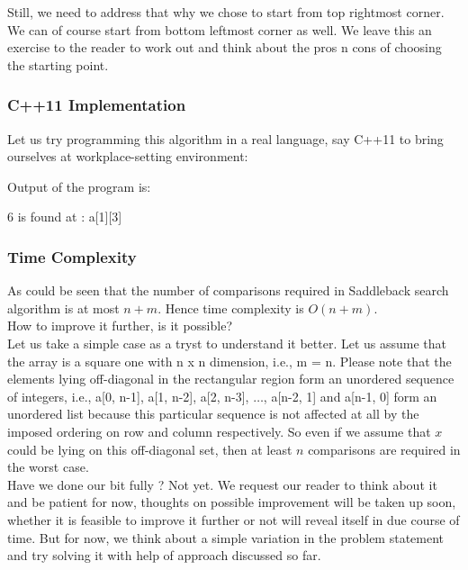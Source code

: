 Still, we need to address that why we chose to start from top rightmost corner. We can of course start from bottom leftmost corner as well. We leave this an exercise to the reader to work out and think about the pros n cons of choosing the starting point.

\subsubsection{C++11 Implementation}

Let us try programming this algorithm in a real language, say C++11 to bring ourselves at workplace-setting environment:




Output of the program is:
\begin{boxedverbatim}
6 is found at : a[1][3]
\end{boxedverbatim}
\subsubsection{Time Complexity} 
As could be seen that the number of comparisons required in Saddleback search algorithm is at most $n + m$. Hence time complexity is $O(n + m)$. 
\vspace{1mm}\\
How to improve it further, is it possible? 
\vspace{1mm}\\
Let us take a simple case as a tryst to understand it better. Let us assume that the array is a square one with n x n dimension, i.e., m = n. Please note that the elements lying off-diagonal in the rectangular region form an unordered sequence of integers, i.e., a[0, n-1], a[1, n-2], a[2, n-3], $\ldots$, a[n-2, 1] and a[n-1, 0] form an unordered list because this particular sequence is not affected at all by the imposed ordering on row and column respectively. So even if we assume that $x$ could be lying on this off-diagonal set, then at least $n$ comparisons are required in the worst case.
\vspace{1mm}\\
Have we done our bit fully ? Not yet. We request our reader to think about it and be patient for now, thoughts on possible improvement will be taken up soon, whether it is feasible to improve it further or not will reveal itself in due course of time. But for now, we think about a simple variation in the problem statement and try solving it with help of approach discussed so far.


